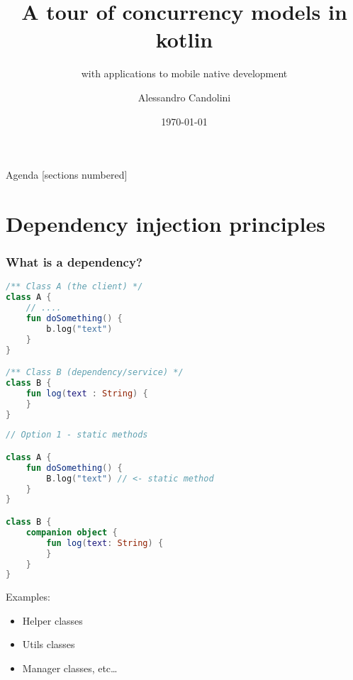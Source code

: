 \documentclass[10pt]{beamer}
\title{A tour of concurrency models in kotlin}
\subtitle{with applications to mobile native development}
\date{\today}
\author[A. Candolini]{Alessandro Candolini}
\begin{document}
\maketitle

\begin{frame}{Agenda}
  [sections numbered]
  \tableofcontents[hideallsubsections]
\end{frame}

\section{Dependency injection principles}
\begin{frame}[fragile]
	\frametitle{What is a dependency?}
		\begin{figure}
			\centering
{}
		\end{figure}
\end{frame}
\begin{frame}[fragile]
\begin{lstlisting}[language=Kotlin, basicstyle=\ttfamily]
/** Class A (the client) */
class A {
    // ....
    fun doSomething() {
        b.log("text")
    }
}

/** Class B (dependency/service) */
class B {
    fun log(text : String) {
    }
}
\end{lstlisting} 
\end{frame}
	\begin{frame}[fragile]
\begin{lstlisting}[language=Kotlin, basicstyle=\ttfamily]
// Option 1 - static methods 

class A {
    fun doSomething() {
        B.log("text") // <- static method
    }
}

class B {
    companion object {
        fun log(text: String) {
        }
    }
}
\end{lstlisting} 
	\end{frame}

	\begin{frame}
		Examples:
		\begin{itemize}
			\item Helper  classes
			\item Utils  classes
			\item Manager classes, etc\ldots
		\end{itemize}
	\end{frame}
\end{document}
